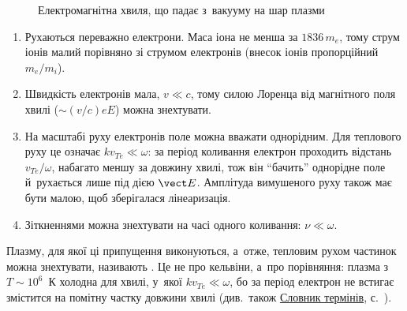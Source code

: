 \begin{figure}[ht]\centering
{}
\caption{Електромагнітна хвиля, що падає з~вакууму на шар плазми}
\label{tikz:emwave}
\end{figure}
\begin{enumerate}
	\item Рухаються переважно електрони. Маса іона не менша за $1836\,m_e$, тому струм
	  іонів малий порівняно зі струмом електронів (внесок іонів пропорційний $m_e/m_i$).
	\item Швидкість електронів мала, $v\ll c$, тому силою Лоренца від магнітного поля
	  хвилі ($\sim(v/c)eE$) можна знехтувати.
	\item\label{asm:uniform-field} На масштабі руху електронів поле можна вважати однорідним. Для теплового руху це
	  означає $kv_{Te}\ll\omega$: за період коливання електрон проходить відстань $v_{Te}/\omega$,
	  набагато меншу за довжину хвилі, тож він \enquote{бачить} однорідне поле й~рухається лише
	  під дією $\vect E$. Амплітуда вимушеного руху також має бути малою, щоб зберігалася
	  лінеаризація.
	\item Зіткненнями можна знехтувати на часі одного коливання: $\nu\ll\omega$.
\end{enumerate}
Плазму, для якої ці припущення виконуються, а~отже, тепловим рухом частинок можна знехтувати, називають
. Це не про кельвіни, а~про порівняння: плазма з~$T\sim10^6$~К холодна для хвилі, у~якої
$kv_{Te}\ll\omega$, бо за період електрон не встигає змістится на помітну частку довжини хвилі
(див.\ також \hyperref[sec:glossary]{Словник термінів}, с.~\pageref{sec:glossary}).

